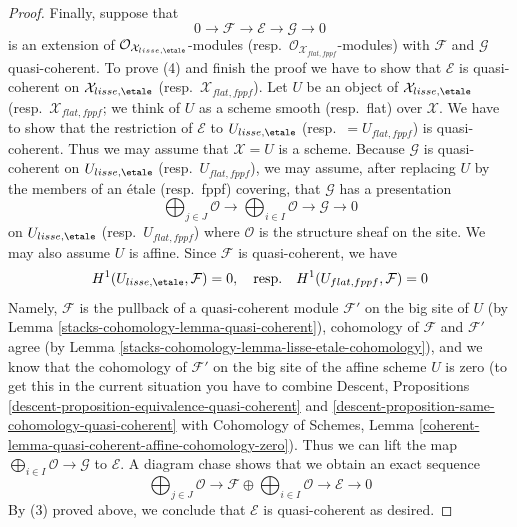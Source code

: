 \begin{proof}
\medskip\noindent
Finally, suppose that
$$
0 \to \mathcal{F} \to \mathcal{E} \to \mathcal{G} \to 0
$$
is an extension of $\mathcal{O}_{\mathcal{X}_{lisse,\etale}}$-modules
(resp.\ $\mathcal{O}_{\mathcal{X}_{flat,fppf}}$-modules) with $\mathcal{F}$
and $\mathcal{G}$ quasi-coherent. To prove (4) and finish the proof
we have to show that
$\mathcal{E}$ is quasi-coherent on $\mathcal{X}_{lisse,\etale}$
(resp.\ $\mathcal{X}_{flat,fppf}$). Let $U$
be an object of $\mathcal{X}_{lisse,\etale}$
(resp.\ $\mathcal{X}_{flat,fppf}$; we think of $U$ as a scheme smooth
(resp.\ flat) over $\mathcal{X}$. We have to show that the restriction
of $\mathcal{E}$ to $U_{lisse,\etale}$ (resp.\ $=U_{flat,fppf}$)
is quasi-coherent. Thus we may assume
that $\mathcal{X} = U$ is a scheme. Because $\mathcal{G}$
is quasi-coherent on $U_{lisse,\etale}$ (resp.\ $U_{flat,fppf}$),
we may assume, after replacing $U$ by the members
of an \'etale (resp.\ fppf) covering, that $\mathcal{G}$ has a
presentation
$$
\bigoplus\nolimits_{j \in J} \mathcal{O} \longrightarrow
\bigoplus\nolimits_{i \in I} \mathcal{O} \longrightarrow
\mathcal{G} \longrightarrow 0
$$
on $U_{lisse,\etale}$ (resp.\ $U_{flat,fppf}$) where $\mathcal{O}$
is the structure sheaf on the site. We may also assume $U$ is affine.
Since $\mathcal{F}$ is quasi-coherent, we have
$$
H^1(U_{lisse,\etale}, \mathcal{F}) = 0,
\quad\text{resp.}\quad
H^1(U_{flat,fppf}, \mathcal{F}) = 0
$$
Namely, $\mathcal{F}$ is the pullback of a quasi-coherent module
$\mathcal{F}'$ on the big site of $U$
(by Lemma \ref{stacks-cohomology-lemma-quasi-coherent}), cohomology
of $\mathcal{F}$ and $\mathcal{F}'$ agree (by
Lemma \ref{stacks-cohomology-lemma-lisse-etale-cohomology}), and we know that
the cohomology of $\mathcal{F}'$ on the big site of the affine scheme $U$
is zero (to get this in the current situation you have to
combine Descent, Propositions
\ref{descent-proposition-equivalence-quasi-coherent} and
\ref{descent-proposition-same-cohomology-quasi-coherent} with
Cohomology of Schemes, Lemma
\ref{coherent-lemma-quasi-coherent-affine-cohomology-zero}).
Thus we can lift the map
$\bigoplus_{i \in I} \mathcal{O} \to \mathcal{G}$
to $\mathcal{E}$. A diagram chase shows that we obtain
an exact sequence
$$
\bigoplus\nolimits_{j \in J} \mathcal{O} \to
\mathcal{F} \oplus \bigoplus\nolimits_{i \in I} \mathcal{O}
\to
\mathcal{E} \to 0
$$
By (3) proved above, we conclude that $\mathcal{E}$ is quasi-coherent
as desired.
\end{proof}

